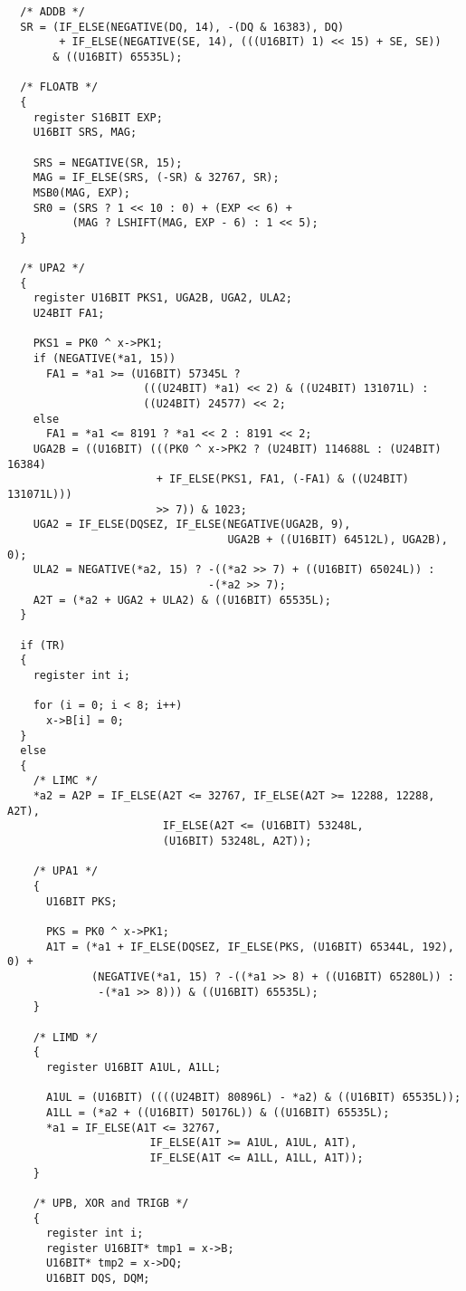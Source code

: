 \begin{verbatim}
  /* ADDB */
  SR = (IF_ELSE(NEGATIVE(DQ, 14), -(DQ & 16383), DQ)
        + IF_ELSE(NEGATIVE(SE, 14), (((U16BIT) 1) << 15) + SE, SE))
       & ((U16BIT) 65535L);
  
  /* FLOATB */
  {
    register S16BIT EXP;
    U16BIT SRS, MAG;

    SRS = NEGATIVE(SR, 15);
    MAG = IF_ELSE(SRS, (-SR) & 32767, SR);
    MSB0(MAG, EXP);
    SR0 = (SRS ? 1 << 10 : 0) + (EXP << 6) +
          (MAG ? LSHIFT(MAG, EXP - 6) : 1 << 5);
  }

  /* UPA2 */
  {
    register U16BIT PKS1, UGA2B, UGA2, ULA2;
    U24BIT FA1;

    PKS1 = PK0 ^ x->PK1;
    if (NEGATIVE(*a1, 15))
      FA1 = *a1 >= (U16BIT) 57345L ?
                     (((U24BIT) *a1) << 2) & ((U24BIT) 131071L) :
                     ((U24BIT) 24577) << 2;
    else
      FA1 = *a1 <= 8191 ? *a1 << 2 : 8191 << 2;
    UGA2B = ((U16BIT) (((PK0 ^ x->PK2 ? (U24BIT) 114688L : (U24BIT) 16384)
                       + IF_ELSE(PKS1, FA1, (-FA1) & ((U24BIT) 131071L)))
                       >> 7)) & 1023;
    UGA2 = IF_ELSE(DQSEZ, IF_ELSE(NEGATIVE(UGA2B, 9),
                                  UGA2B + ((U16BIT) 64512L), UGA2B), 0);
    ULA2 = NEGATIVE(*a2, 15) ? -((*a2 >> 7) + ((U16BIT) 65024L)) :
                               -(*a2 >> 7);
    A2T = (*a2 + UGA2 + ULA2) & ((U16BIT) 65535L);
  }

  if (TR)
  {
    register int i;

    for (i = 0; i < 8; i++)
      x->B[i] = 0;
  }
  else
  {
    /* LIMC */
    *a2 = A2P = IF_ELSE(A2T <= 32767, IF_ELSE(A2T >= 12288, 12288, A2T),
                        IF_ELSE(A2T <= (U16BIT) 53248L,
                        (U16BIT) 53248L, A2T));
    
    /* UPA1 */
    {
      U16BIT PKS;

      PKS = PK0 ^ x->PK1;
      A1T = (*a1 + IF_ELSE(DQSEZ, IF_ELSE(PKS, (U16BIT) 65344L, 192), 0) +
             (NEGATIVE(*a1, 15) ? -((*a1 >> 8) + ((U16BIT) 65280L)) :
              -(*a1 >> 8))) & ((U16BIT) 65535L);
    }

    /* LIMD */
    {
      register U16BIT A1UL, A1LL;
      
      A1UL = (U16BIT) ((((U24BIT) 80896L) - *a2) & ((U16BIT) 65535L));
      A1LL = (*a2 + ((U16BIT) 50176L)) & ((U16BIT) 65535L);
      *a1 = IF_ELSE(A1T <= 32767,
                      IF_ELSE(A1T >= A1UL, A1UL, A1T),
                      IF_ELSE(A1T <= A1LL, A1LL, A1T));
    }

    /* UPB, XOR and TRIGB */
    {
      register int i;
      register U16BIT* tmp1 = x->B;
      U16BIT* tmp2 = x->DQ;
      U16BIT DQS, DQM;
      

\end{verbatim}
